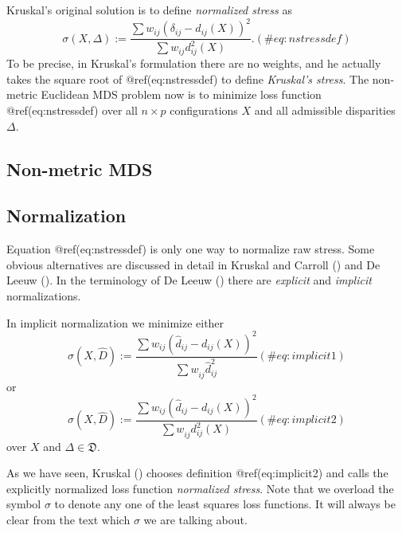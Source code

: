 \documentclass[
  12pt,
  letterpaper,
  DIV=11,
  numbers=noendperiod]{scrartcl}
\begin{document}
Kruskal's original solution is to define \emph{normalized stress} as
\begin{equation}
\sigma(X,\Delta):=\frac{\sum w_{ij}(\delta_{ij}-d_{ij}(X))^2}{\sum w_{ij}d_{ij}^2(X)}.
(\#eq:nstressdef)
\end{equation} To be precise, in Kruskal's formulation there are no
weights, and he actually takes the square root of @ref(eq:nstressdef) to
define \emph{Kruskal's stress}. The non-metric Euclidean MDS problem now
is to minimize loss function @ref(eq:nstressdef) over all \(n\times p\)
configurations \(X\) and all admissible disparities \(\Delta\).

\subsection{Non-metric MDS}\label{non-metric-mds}

\subsection{Normalization}\label{normalization}

Equation @ref(eq:nstressdef) is only one way to normalize raw stress.
Some obvious alternatives are discussed in detail in Kruskal and Carroll
() and De Leeuw
(). In the terminology of De Leeuw
() there are \emph{explicit} and
\emph{implicit} normalizations.

In implicit normalization we minimize either \begin{equation}
\sigma(X,\hat D):=\frac{\sum  w_{ij}(\hat d_{ij} -d_{ij}(X))^2}{\sum   w_{ij}^{\ }\hat d_{ij}^2}
(\#eq:implicit1)
\end{equation} or \begin{equation}
\sigma(X,\hat D):=\frac{\sum   w_{ij}(\hat d_{ij}-d_{ij}(X))^2}{\sum   w_{ij}^{\ }d_{ij}^2(X) }
(\#eq:implicit2)
\end{equation} over \(X\) and \(\Delta\in\mathfrak{D}\).

As we have seen, Kruskal () chooses
definition @ref(eq:implicit2) and calls the explicitly normalized loss
function \emph{normalized stress}. Note that we overload the symbol
\(\sigma\) to denote any one of the least squares loss functions. It
will always be clear from the text which \(\sigma\) we are talking
about.
\end{document}
